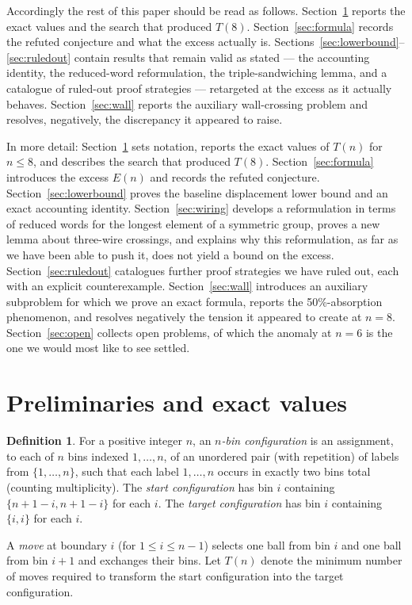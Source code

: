 \documentclass[11pt]{amsart}
\theoremstyle{plain}
\theoremstyle{definition}
\newtheorem{definition}[theorem]{Definition}
\theoremstyle{remark}
\begin{document}
Accordingly the rest of this paper should be read as follows. Section~\ref{sec:prelim} reports the exact values and the search that produced $T(8)$. Section~\ref{sec:formula} records the refuted conjecture and what the excess actually is. Sections~\ref{sec:lowerbound}--\ref{sec:ruledout} contain results that remain valid as stated --- the accounting identity, the reduced-word reformulation, the triple-sandwiching lemma, and a catalogue of ruled-out proof strategies --- retargeted at the excess as it actually behaves. Section~\ref{sec:wall} reports the auxiliary wall-crossing problem and resolves, negatively, the discrepancy it appeared to raise.

In more detail: Section~\ref{sec:prelim} sets notation, reports the exact values of $T(n)$ for $n\le 8$, and describes the search that produced $T(8)$. Section~\ref{sec:formula} introduces the excess $E(n)$ and records the refuted conjecture. Section~\ref{sec:lowerbound} proves the baseline displacement lower bound and an exact accounting identity. Section~\ref{sec:wiring} develops a reformulation in terms of reduced words for the longest element of a symmetric group, proves a new lemma about three-wire crossings, and explains why this reformulation, as far as we have been able to push it, does not yield a bound on the excess. Section~\ref{sec:ruledout} catalogues further proof strategies we have ruled out, each with an explicit counterexample. Section~\ref{sec:wall} introduces an auxiliary subproblem for which we prove an exact formula, reports the 50\%-absorption phenomenon, and resolves negatively the tension it appeared to create at $n=8$. Section~\ref{sec:open} collects open problems, of which the anomaly at $n=6$ is the one we would most like to see settled.

\section{Preliminaries and exact values}
\label{sec:prelim}

\begin{definition}
For a positive integer $n$, an \emph{$n$-bin configuration} is an assignment, to each of $n$ bins indexed $1,\dots,n$, of an unordered pair (with repetition) of labels from $\{1,\dots,n\}$, such that each label $1,\dots,n$ occurs in exactly two bins total (counting multiplicity). The \emph{start configuration} has bin $i$ containing $\{n+1-i,n+1-i\}$ for each $i$. The \emph{target configuration} has bin $i$ containing $\{i,i\}$ for each $i$.

A \emph{move} at boundary $i$ (for $1\le i\le n-1$) selects one ball from bin $i$ and one ball from bin $i+1$ and exchanges their bins. Let $T(n)$ denote the minimum number of moves required to transform the start configuration into the target configuration.
\end{definition}
\end{document}
